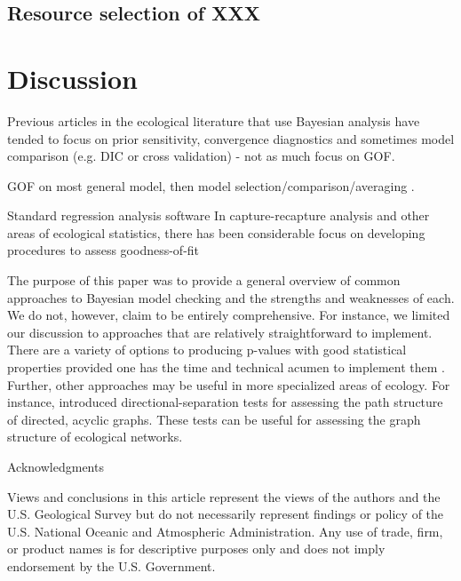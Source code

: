 \documentclass[12pt,english]{article}
\begin{document}
\begin{spacing}{1.9}
\subsection{Resource selection of XXX}

\section{Discussion}


Previous articles in the ecological literature that use Bayesian analysis have tended to focus on prior sensitivity, convergence diagnostics and sometimes model comparison (e.g. DIC or cross validation) - not as much focus on GOF.

GOF on most general model, then model selection/comparison/averaging \citep{BurnhamAnderson2002}.

Standard regression analysis software In capture-recapture analysis and other areas of ecological statistics, there has been considerable focus on developing procedures to assess goodness-of-fit \citep[e.g.][]{ChoquetEtAl2009}


The purpose of this paper was to provide a general overview of common approaches to Bayesian model checking and the strengths and weaknesses of each.  We do not, however, claim to be entirely comprehensive. For instance, we limited our discussion to approaches that are relatively straightforward to implement.  There are a variety of options to producing p-values with good statistical properties provided one has the time and technical acumen to implement them \citep[e.g. ``partial posterior" and ``conditional predictive" p-values; see][]{BayarriBerger1999,RobinsEtAl2000,BayarriCastellanos2007}. Further, other approaches may be useful in more specialized areas of ecology.
For instance, \citet{Shipley2009} introduced directional-separation tests for assessing the path structure of directed, acyclic graphs.  These tests can be useful for assessing the graph structure of ecological networks.


\centerline{\sc Acknowledgments} Views and conclusions in this article represent the views of the authors and the U.S. Geological Survey but do not necessarily represent findings or policy of the U.S. National Oceanic and Atmospheric Administration.  Any use of trade, firm, or product names is for descriptive purposes only and does not imply endorsement by the U.S. Government.

\renewcommand{\refname}{Literature Cited}




\end{spacing}
\end{document}
